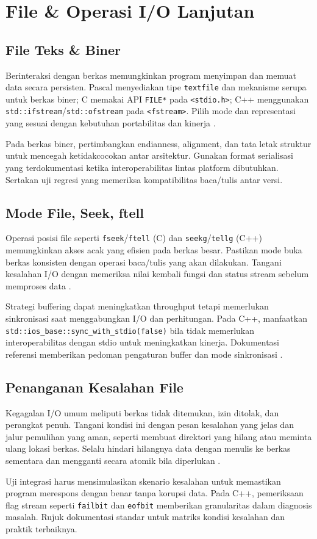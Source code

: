 \documentclass[../main.tex]{subfiles}
\begin{document}
\chapter{File \& Operasi I/O Lanjutan}
\section{File Teks \& Biner}
Berinteraksi dengan berkas memungkinkan program menyimpan dan memuat data secara persisten. Pascal menyediakan tipe \texttt{textfile} dan mekanisme serupa untuk berkas biner; C memakai API \texttt{FILE*} pada \texttt{<stdio.h>}; C++ menggunakan \texttt{std::ifstream}/\texttt{std::ofstream} pada \texttt{<fstream>}. Pilih mode dan representasi yang sesuai dengan kebutuhan portabilitas dan kinerja \parencite{free-pascal-docs,gnu-c-manual,cpp-reference}.

Pada berkas biner, pertimbangkan endianness, alignment, dan tata letak struktur untuk mencegah ketidakcocokan antar arsitektur. Gunakan format serialisasi yang terdokumentasi ketika interoperabilitas lintas platform dibutuhkan. Sertakan uji regresi yang memeriksa kompatibilitas baca/tulis antar versi.

\section{Mode File, Seek, ftell}
Operasi posisi file seperti \texttt{fseek}/\texttt{ftell} (C) dan \texttt{seekg}/\texttt{tellg} (C++) memungkinkan akses acak yang efisien pada berkas besar. Pastikan mode buka berkas konsisten dengan operasi baca/tulis yang akan dilakukan. Tangani kesalahan I/O dengan memeriksa nilai kembali fungsi dan status stream sebelum memproses data \parencite{gnu-c-manual,cpp-reference}.

Strategi buffering dapat meningkatkan throughput tetapi memerlukan sinkronisasi saat menggabungkan I/O dan perhitungan. Pada C++, manfaatkan \texttt{std::ios\_base::sync\_with\_stdio(false)} bila tidak memerlukan interoperabilitas dengan stdio untuk meningkatkan kinerja. Dokumentasi referensi memberikan pedoman pengaturan buffer dan mode sinkronisasi \parencite{cplusplus-io,cpp-reference}.

\section{Penanganan Kesalahan File}
Kegagalan I/O umum meliputi berkas tidak ditemukan, izin ditolak, dan perangkat penuh. Tangani kondisi ini dengan pesan kesalahan yang jelas dan jalur pemulihan yang aman, seperti membuat direktori yang hilang atau meminta ulang lokasi berkas. Selalu hindari hilangnya data dengan menulis ke berkas sementara dan mengganti secara atomik bila diperlukan \parencite{gnu-c-manual}.

Uji integrasi harus mensimulasikan skenario kesalahan untuk memastikan program merespons dengan benar tanpa korupsi data. Pada C++, pemeriksaan flag stream seperti \texttt{failbit} dan \texttt{eofbit} memberikan granularitas dalam diagnosis masalah. Rujuk dokumentasi standar untuk matriks kondisi kesalahan dan praktik terbaiknya.
\end{document}
